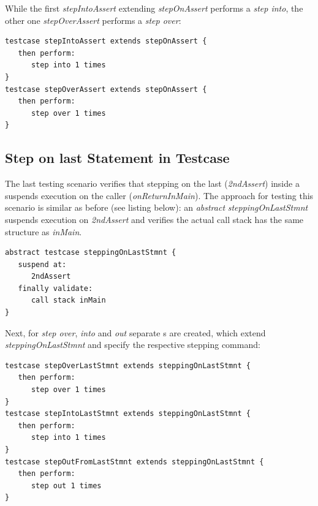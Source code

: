 While the first  \emph{stepIntoAssert} extending
\emph{stepOnAssert} performs a \emph{step into}, the other one
\emph{stepOverAssert} performs a \emph{step over}:

\begin{lstlisting}[language=testingDSL]
testcase stepIntoAssert extends stepOnAssert {            
   then perform:                         
      step into 1 times                            
}
testcase stepOverAssert extends stepOnAssert {            
   then perform:                         
      step over 1 times                            
}
\end{lstlisting}

\subsection{Step on last Statement in Testcase}

The last testing scenario verifies that stepping on the last 
(\emph{2ndAssert}) inside a  suspends execution on the caller
 (\emph{onReturnInMain}).
The approach for testing this scenario is similar as before (see listing
below): an \emph{abstract} 
\emph{steppingOnLastStmnt} suspends execution on
\emph{2ndAssert} and verifies the actual call stack has the same structure as
\emph{inMain}.

\begin{lstlisting}[language=testingDSL]
abstract testcase steppingOnLastStmnt {
   suspend at: 
      2ndAssert
   finally validate:
      call stack inMain
}
\end{lstlisting}

Next, for \emph{step over}, \emph{into} and \emph{out} separate
s are created, which extend \emph{steppingOnLastStmnt}
and specify the respective stepping command:

\begin{lstlisting}[language=testingDSL]
testcase stepOverLastStmnt extends steppingOnLastStmnt {            
   then perform:                         
      step over 1 times                            
}
testcase stepIntoLastStmnt extends steppingOnLastStmnt {            
   then perform:                         
      step into 1 times                            
}
testcase stepOutFromLastStmnt extends steppingOnLastStmnt {            
   then perform:                         
      step out 1 times                            
}
\end{lstlisting}		
			
	